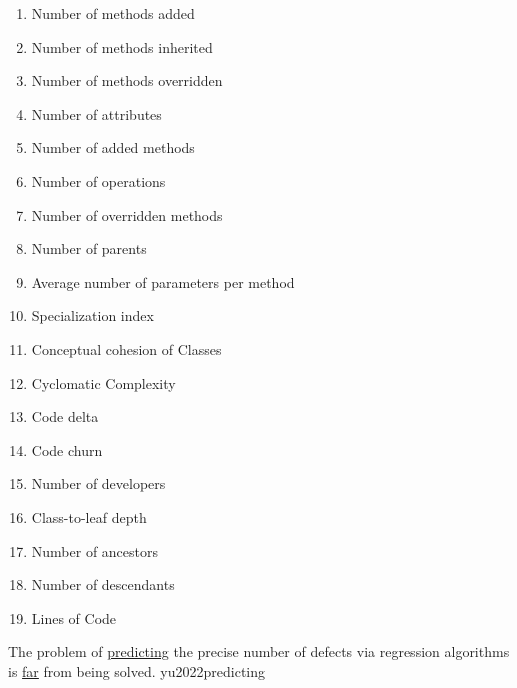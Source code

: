 \documentclass{article}
\begin{document}
{\begin{pptWide}{5}
\begin{enumerate}
  \item \textbf{} Number of methods added
  \item \textbf{} Number of methods inherited
  \item \textbf{} Number of methods overridden
  \item \textbf{} Number of attributes
  \item \textbf{} Number of added methods
  \item \textbf{} Number of operations
  \item \textbf{} Number of overridden methods
  \item \textbf{} Number of parents
  \item \textbf{} Average number of parameters per method
  \item \textbf{} Specialization index
  \item \textbf{} Conceptual cohesion of Classes
  \item \textbf{} Cyclomatic Complexity
  \item \textbf{} Code delta
  \item \textbf{} Code churn
  \item \textbf{} Number of developers
  \item \textbf{} Class-to-leaf depth
  \item \textbf{} Number of ancestors
  \item \textbf{} Number of descendants
  \item \textbf{} Lines of Code
  \end{enumerate}
  \end{pptWide}
  \par
  }

  {The problem of \ul{predicting} the precise number of defects via regression algorithms is \ul{far} from being solved.}
  {yu2022predicting}

\end{document}
